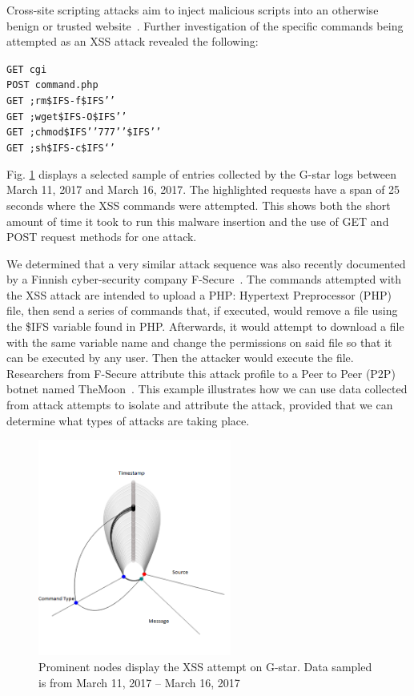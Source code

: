 Cross-site scripting attacks aim to inject malicious scripts into an otherwise benign or trusted website~\cite{XSS-def}. 
Further investigation of the specific commands being attempted as an XSS attack revealed the following:

\noindent \texttt{GET cgi\\     
POST command.php\\
GET ;rm\$IFS-f\$IFS’'\\
GET ;wget\$IFS-O\$IFS’'\\
GET ;chmod\$IFS'’777’'\$IFS’'\\
GET ;sh\$IFS-c\$IFS‘'}

\noindent Fig. \ref{fig:XSS} displays a selected sample of entries collected by the G-star logs between March 11, 2017 and March 16, 2017. 
The highlighted requests have a span of 25 seconds where the XSS commands were attempted.
This shows both the short amount of time it took to run this malware insertion and the use of GET and POST request methods for one attack.

We determined that a very similar attack sequence was also recently documented by a Finnish cyber-security company F-Secure~\cite{F-Secure}. 
The commands attempted with the XSS attack are intended to upload a PHP: Hypertext Preprocessor (PHP) file, then send a series of commands that, if executed, would remove a file using the \$IFS variable found in PHP. 
Afterwards, it would attempt to download a file with the same variable name and change the permissions on said file so that it can be executed by any user.  
Then the attacker would execute the file. 
Researchers from F-Secure  attribute this attack profile to a Peer to Peer (P2P) botnet named TheMoon~\cite{TheMoon}. 
This example illustrates how we can use data collected from attack attempts to isolate and attribute the attack, provided that we can determine what types of attacks are taking place.

\begin{figure}[t]
   \centering
   \includegraphics[width=2.5in]{images/XSS.png}  
   \caption{Prominent nodes display the XSS attempt on G-star. Data sampled is from March 11, 2017 -- March 16, 2017}
   \label{fig:XSS}
\end{figure}

